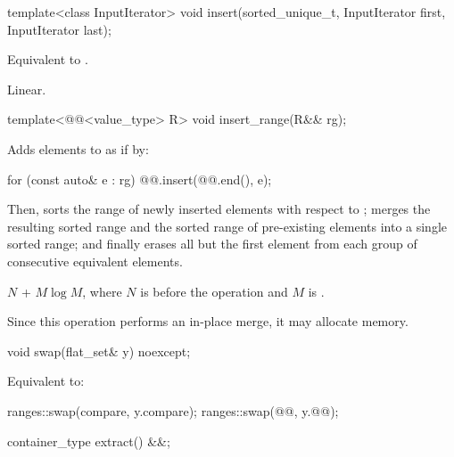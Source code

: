 %
\begin{itemdecl}
template<class InputIterator>
  void insert(sorted_unique_t, InputIterator first, InputIterator last);
\end{itemdecl}

\begin{itemdescr}
\pnum
\effects
Equivalent to .

\pnum
\complexity
Linear.
\end{itemdescr}

%
\begin{itemdecl}
template<@@<value_type> R>
  void insert_range(R&& rg);
\end{itemdecl}

\begin{itemdescr}
\pnum
\effects
Adds elements to  as if by:
\begin{codeblock}
for (const auto& e : rg) {
  @@.insert(@@.end(), e);
}
\end{codeblock}
Then,
sorts the range of newly inserted elements with respect to ;
merges the resulting sorted range and
the sorted range of pre-existing elements into a single sorted range; and
finally erases all but the first element
from each group of consecutive equivalent elements.

\pnum
\complexity
$N$ + $M \log M$, where $N$ is  before the operation and $M$
is .

\pnum
\remarks
Since this operation performs an in-place merge, it may allocate memory.
\end{itemdescr}

%
\begin{itemdecl}
void swap(flat_set& y) noexcept;
\end{itemdecl}

\begin{itemdescr}
\pnum
\effects
Equivalent to:
\begin{codeblock}
ranges::swap(compare, y.compare);
ranges::swap(@@, y.@@);
\end{codeblock}
\end{itemdescr}

%
\begin{itemdecl}
container_type extract() &&;
\end{itemdecl}

